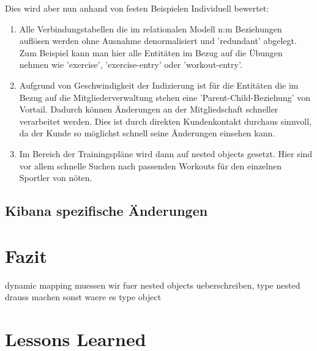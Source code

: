 \documentclass[twocolumn,10pt]{asme2ej}
\begin{document}
	Dies wird aber nun anhand von festen Beispielen Individuell bewertet:
	\begin{enumerate}
		\item Alle Verbindungstabellen die im relationalen Modell n:m Beziehungen aufl\"osen werden ohne Ausnahme denormalisiert und 'redundant' abgelegt. Zum Beispiel kann man hier alle Entit\"aten im Bezug auf die \"Ubungen nehmen wie 'exercise', 'exercise-entry' oder 'workout-entry'.
		\item Aufgrund von Geschwindigkeit der Indizierung ist f\"ur die Entit\"aten die im Bezug auf die Mitgliederverwaltung stehen eine 'Parent-Child-Beziehung' von Vortail. Dadurch k\"onnen \"Anderungen an der Mitgliedschaft schneller verarbeitet werden. Dies ist durch direkten Kundenkontakt durchaus sinnvoll, da der Kunde so m\"oglichst schnell seine \"Anderungen einsehen kann.
		\item Im Bereich der Trainingspl\"ane wird dann auf nested objects gesetzt. Hier sind vor allem schnelle Suchen nach passenden Workouts f\"ur den einzelnen Sportler von n\"oten.
	\end{enumerate}
	\subsection{Kibana spezifische \"Anderungen}
	
	
	\section{Fazit}
	dynamic mapping muessen wir fuer nested objects ueberschreiben, type nested drauss machen
	sonst waere es type object
	
	
	\section{Lessons Learned}

	
	
	
	
	
	
\end{document}
